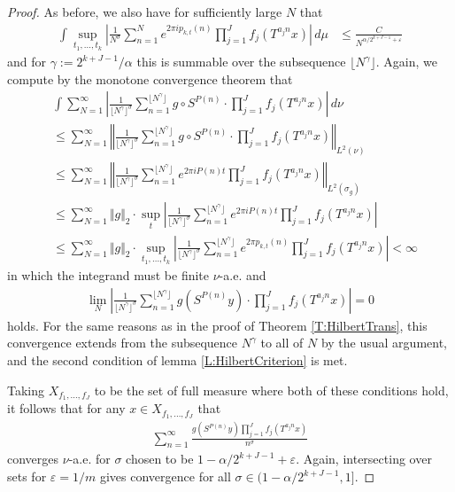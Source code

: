 \documentclass[11pt, oneside]{amsart}   	%
\newcommand{\ep}{\varepsilon}
\newcommand{\1}{\mathbbm{1}}
\newcommand{\floor}[1]{\lfloor#1\rfloor}
\theoremstyle{definition}
\begin{document}
\begin{proof}
As before, we also have for sufficiently large $N$ that
\begin{align*}
\int \sup_{t_1, \dots, t_k} \left| \frac{1}{N^\sigma} \sum_{n=1}^N e^{2\pi i p_{k, t}(n)} \prod_{j=1}^{J} f_j(T^{a_jn}x)\right| \, d\mu & \leq \frac{C}{N^{\alpha/2^{k+J-1} + \ep}}
\end{align*}
and for $\gamma := 2^{k+J-1}/\alpha$ this is summable over the subsequence $\floor{N^\gamma}$. Again, we compute by the monotone convergence theorem that
\begin{align*}
&\int \sum_{N=1}^\infty\left|\frac{1}{\floor{N^\gamma}^\sigma} \sum_{n=1}^{\floor{N^\gamma}} g\circ S^{P(n)} \cdot \prod_{j=1}^J f_j(T^{a_j n} x)\right| \, d\nu \\
&\leq \sum_{N=1}^\infty\left\Vert\frac{1}{\floor{N^\gamma}^\sigma} \sum_{n=1}^{\floor{N^\gamma}} g\circ S^{P(n)} \cdot \prod_{j=1}^J f_j(T^{a_j n} x)\right\Vert_{L^2(\nu)} \\
&\leq \sum_{N=1}^\infty\left\Vert\frac{1}{\floor{N^\gamma}^\sigma} \sum_{n=1}^{\floor{N^\gamma}} e^{2\pi i P(n)t} \prod_{j=1}^J f_j(T^{a_j n} x)\right\Vert_{L^2(\sigma_g)} \\
&\leq \sum_{N=1}^\infty \Vert g \Vert_2 \cdot \sup_t\left|\frac{1}{\floor{N^\gamma}^\sigma} \sum_{n=1}^{\floor{N^\gamma}} e^{2\pi i P(n)t} \prod_{j=1}^J f_j(T^{a_j n} x)\right| \\
&\leq \sum_{N=1}^\infty \Vert g \Vert_2 \cdot \sup_{t_1, \dots, t_k}\left|\frac{1}{\floor{N^\gamma}^\sigma} \sum_{n=1}^{\floor{N^\gamma}} e^{2\pi p_{k, t}(n)} \prod_{j=1}^J f_j(T^{a_j n} x)\right| < \infty
\end{align*}
in which the integrand must be finite $\nu$-a.e. and
\begin{align*}
\lim_N\left|\frac{1}{\floor{N^\gamma}^\sigma} \sum_{n=1}^{\floor{N^\gamma}} g(S^{P(n)}y) \cdot \prod_{j=1}^J f_j(T^{a_j n} x)\right| =0
\end{align*}
holds. For the same reasons as in the proof of Theorem \ref{T:HilbertTrans}, this convergence extends from the subsequence $N^\gamma$ to all of $N$ by the usual argument, and the second condition of lemma \ref{L:HilbertCriterion} is met.

Taking $X_{f_1, \dots, f_J}$ to be the set of full measure where both of these conditions hold, it follows that for any $x\in X_{f_1, \dots, f_J}$ that
\begin{align*}
\sum_{n=1}^\infty \frac{g(S^{P(n)}y) \prod_{j=1}^J f_j(T^{a_j n}x)}{n^\sigma}
\end{align*}
converges $\nu$-a.e. for $\sigma$ chosen to be $1 - \alpha/2^{k+J-1} + \ep$. Again, intersecting over sets for $\ep = 1/m$ gives convergence for all $\sigma \in (1 - \alpha/2^{k+J-1}, 1]$.
\end{proof}
\end{document}
